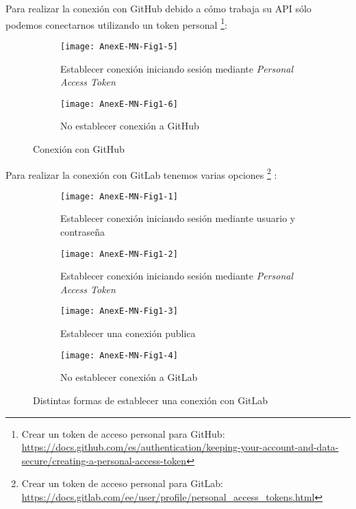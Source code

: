 
Para realizar la conexión con GitHub debido a cómo trabaja su API sólo podemos conectarnos utilizando un token personal \footnote{Crear un token de acceso personal para GitHub: \url{https://docs.github.com/es/authentication/keeping-your-account-and-data-secure/creating-a-personal-access-token}}:
\begin{figure}[!h]
	\centering
	\begin{subfigure}{.45\textwidth}
		\centering
		\texttt{[image: AnexE-MN-Fig1-5]}
		\caption{Establecer conexión iniciando sesión mediante \textit{Personal Access Token}}
		\label{fig:dialogo-conexion_contraseña}
	\end{subfigure}\hfill
	\begin{subfigure}{.45\textwidth}
		\centering
		\texttt{[image: AnexE-MN-Fig1-6]}
		\caption{No establecer conexión a GitHub}
		\label{fig:dialogo-conexion_token}
	\end{subfigure}
	\caption{Conexión con GitHub}
	\label{fig:AnexE-MN-Fig1}
\end{figure}


Para realizar la conexión con GitLab tenemos varias opciones \footnote{Crear un token de acceso personal para GitLab: \url{https://docs.gitlab.com/ee/user/profile/personal_access_tokens.html}}
		\label{fig:dialogo-conexion_token}:\\

\begin{figure}[!h]
	\centering
	\begin{subfigure}{.45\textwidth}
		\centering
		\texttt{[image: AnexE-MN-Fig1-1]}
		\caption{Establecer conexión iniciando sesión mediante usuario y contraseña}
		\label{fig:dialogo-conexion_contraseña}
	\end{subfigure}\hfill
	\begin{subfigure}{.45\textwidth}
		\centering
		\texttt{[image: AnexE-MN-Fig1-2]}
		\caption{Establecer conexión iniciando sesión mediante \textit{Personal Access Token}}
	\end{subfigure}
	\begin{subfigure}{.45\textwidth}
		\centering
		\texttt{[image: AnexE-MN-Fig1-3]}
		\caption{Establecer una conexión publica}
		\label{fig:dialogo-conexion_publica}
	\end{subfigure}\hfill
	\begin{subfigure}{.45\textwidth}
		\centering
		\texttt{[image: AnexE-MN-Fig1-4]}
		\caption{No establecer conexión a GitLab}
		\label{fig:dialogo-conexion_sin-conexion}
	\end{subfigure}
	\caption{Distintas formas de establecer una conexión con GitLab}
	\label{fig:AnexE-MN-Fig1}
\end{figure}

